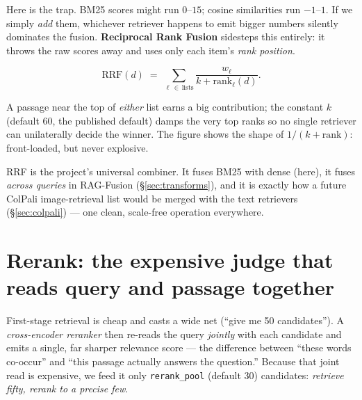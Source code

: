 \documentclass[11pt]{article}
\newcommand{\code}[1]{\texttt{#1}}
\begin{document}
Here is the trap. BM25 scores might run $0$--$15$; cosine similarities run $-1$--$1$. If we simply
\emph{add} them, whichever retriever happens to emit bigger numbers silently dominates the fusion.
\textbf{Reciprocal Rank Fusion} sidesteps this entirely: it throws the raw scores away and uses only
each item's \emph{rank position}.

\[
\mathrm{RRF}(d) \;=\; \sum_{\ell \,\in\, \text{lists}}
\frac{w_\ell}{k + \mathrm{rank}_\ell(d)}.
\]

A passage near the top of \emph{either} list earns a big contribution; the constant $k$ (default
$60$, the published default) damps the very top ranks so no single retriever can unilaterally decide
the winner. The figure shows the shape of $1/(k+\mathrm{rank})$: front-loaded, but never explosive.

\begin{center}
\end{center}

\noindent RRF is the project's universal combiner. It fuses BM25 with dense (here), it fuses
\emph{across queries} in RAG-Fusion (\S\ref{sec:transforms}), and it is exactly how a future ColPali
image-retrieval list would be merged with the text retrievers (\S\ref{sec:colpali}) --- one clean,
scale-free operation everywhere.

\section{Rerank: the expensive judge that reads query and passage together}

First-stage retrieval is cheap and casts a wide net (``give me 50 candidates''). A
\emph{cross-encoder reranker} then re-reads the query \emph{jointly} with each candidate and emits a
single, far sharper relevance score --- the difference between ``these words co-occur'' and ``this
passage actually answers the question.'' Because that joint read is expensive, we feed it only
\code{rerank\_pool} (default $30$) candidates: \emph{retrieve fifty, rerank to a precise few}.
\end{document}
